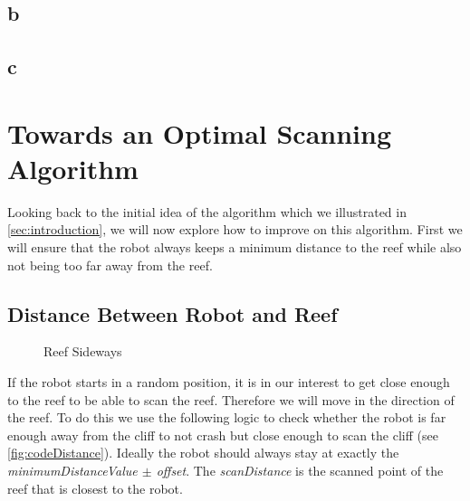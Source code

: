 \documentclass[twoside, 12pt]{article}
\begin{document}
\subsection{b}

\subsection{c}
\newpage
\section{Towards an Optimal Scanning Algorithm}
\label{sec:optimalScanningAlgorithm}

Looking back to the initial idea of the algorithm which we illustrated in \autoref{sec:introduction}, we will now explore how to improve on this algorithm. First we will ensure that the robot always keeps a minimum distance to the reef while also not being too far away from the reef.\\

\subsection{Distance Between Robot and Reef}

\begin{figure}
\vspace{-28pt}
  \begin{center}
  \end{center}
\vspace{-20pt}
  \caption{Reef Sideways}
  \label{fig:reef}
\vspace{20pt}
\end{figure}

If the robot starts in a random position, it is in our interest to get close enough to the reef to be able to scan the reef. Therefore we will move in the direction of the reef. To do this we use the following logic to check whether the robot is far enough away from the cliff to not crash but close enough to scan the cliff (see \autoref{fig:codeDistance}). Ideally the robot should always stay at exactly the \textit{minimumDistanceValue $\pm$ offset}. The \textit{scanDistance} is the scanned point of the reef that is closest to the robot.\\
\end{document}
